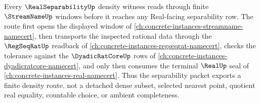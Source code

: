 Every $\RealSeparabilityUp$ density witness reads through finite $\StreamNameUp$ windows before it reaches any Real-facing separability row. The route first opens the displayed window of \autoref{ch:concrete-instances-streamname-namecert}, then transports the inspected rational data through the $\RegSeqRatUp$ readback of \autoref{ch:concrete-instances-regseqrat-namecert}, checks the tolerance against the $\DyadicRatCoreUp$ rows of \autoref{ch:concrete-instances-dyadicratcore-namecert}, and only then consumes the terminal $\RealUp$ seal of \autoref{ch:concrete-instances-real-namecert}. Thus the separability packet exports a finite density route, not a detached dense subset, selected nearest point, quotient real equality, countable choice, or ambient completeness.
